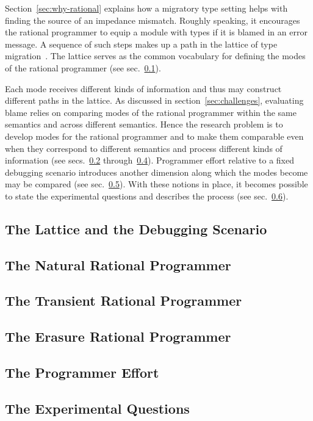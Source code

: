 
Section~\ref{sec:why-rational} explains how a migratory type setting helps with
finding the source of an impedance mismatch. Roughly speaking, it encourages the
rational programmer to equip a module with types if it is blamed in an error
message. A sequence of such steps makes up a path in the
lattice of type migration~\citep{tfgnvf-popl-2016}. The lattice serves as the
common vocabulary for defining the modes of the rational programmer (see
sec.~\ref{sub:stuff}).

Each mode receives different kinds of information and thus may construct
different paths in the lattice. As discussed in section~\ref{sec:challenges},
evaluating blame relies on comparing modes of the rational programmer
within the same semantics and across different semantics.  
Hence the research problem is to develop modes for the rational programmer and to make
them comparable even when they correspond to different semantics and process
different kinds of information (see secs.~\ref{sub:natural}
through~\ref{sub:erasure}). Programmer effort relative to a fixed debugging
scenario introduces another dimension along which the modes become may be
compared (see sec.~\ref{sub:effort}). With these notions in place, it
becomes possible to state the experimental questions and describes the process (see sec.~\ref{sub:experiment}).

\def\rsub#1#2{\subsection{#2} \label{sub:#1} }

\rsub{stuff}     {The Lattice and the Debugging Scenario} 
\rsub{natural}   {The Natural Rational Programmer} 
\rsub{transient} {The Transient Rational Programmer} 
\rsub{erasure}   {The Erasure Rational Programmer} 
\rsub{effort}    {The Programmer Effort} \label{subsec:effort}
\rsub{experiment}{The Experimental Questions} 
